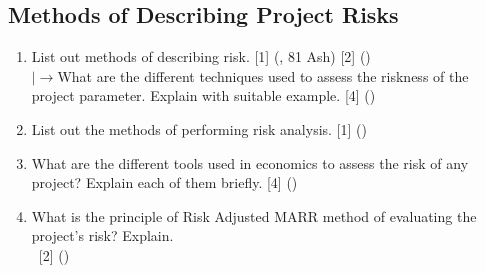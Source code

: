 \documentclass[12pt]{article}
\newcommand{\lb}{\\ $\left|\rightarrow\right.$}
\newcommand{\enter}{\\\textcolor{white}{1}}
\begin{document}
	\subsection{Methods of Describing Project Risks}
		\begin{enumerate}[noitemsep, topsep=0pt]
			\item List out methods of describing risk. \hfill [1] (, 81 Ash) [2] ()
			\lb What are the different techniques used to assess the riskness of the project parameter. Explain with suitable example. \hfill [4] () 

			\item List out the methods of performing risk analysis. \hfill [1] ()

			\item What are the different tools used in economics to assess the risk of any project? Explain each of them briefly. \hfill [4] ()

			\item What is the principle of Risk Adjusted MARR method of evaluating the project's risk? Explain.
			\enter\hfill [2] ()
		\end{enumerate}
\end{document}
